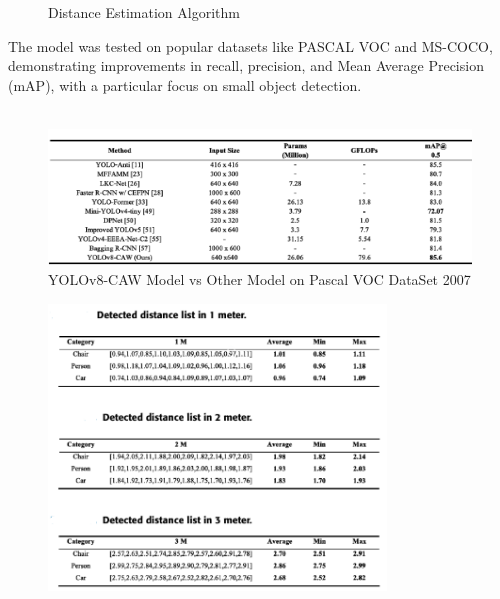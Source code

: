 {\begin{figure}[h!]
\end{figure}
%  
% 
\setlength{\fboxsep}{0pt} %
\setlength{\fboxrule}{1pt} %
%
\begin{figure}[h!]
    \centering
    \caption{Distance Estimation Algorithm}
\end{figure}
%
%
The model was tested on popular datasets like PASCAL VOC and MS-COCO, demonstrating improvements in recall, precision, and Mean Average Precision (mAP), with a particular focus on small object detection.\\\\
%
\begin{figure}[h!]
    \centering
    \includegraphics[width=1\textwidth]{images/YOLOv8-CAW vs Other Models.png}
    \caption{YOLOv8-CAW Model vs Other Model on Pascal VOC DataSet 2007}
\end{figure}
%
\begin{figure}[h!]
    \centering
    \includegraphics[width=0.8\textwidth]{images/Distance Estimation Result.png}

\end{figure}}
